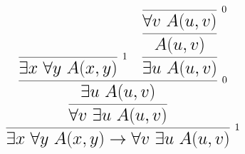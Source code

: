 \documentclass[14pt,border=2pt]{standalone}
\begin{document}
        $$
        \LARGE 

\begin{prooftree}
\infer0[\normalsize 1]{\exists x~ \forall y~ A(x,y)} 
\infer0[\normalsize 0]{\forall v~ A(u,v)} 
\infer1{A(u,v)}
\infer1{\exists u~ A(u,v)}
\infer2[\normalsize 0]{\exists u~ A(u,v)}
\infer1{\forall v~ \exists u~ A(u,v)}
\infer1[\normalsize 1]{\exists x~ \forall y~ A(x,y) \to 
\forall v~ \exists u~ A(u,v)}
\end{prooftree}
        $$
        
\end{document}

